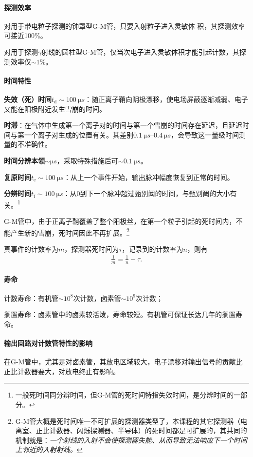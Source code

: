 \paragraph{探测效率}
对用于带电粒子探测的钟罩型G-M管，只要入射粒子进入灵敏体
积，其探测效率可接近100\%。

对用于探测$\gamma$射线的圆柱型G-M管，仅当次电子进入灵敏体积才能引起计数，其探测效率仅$\sim 1\%$。
\paragraph{时间特性}
\begin{compactitem}
	\item \textbf{失效（死）时间}$t_\mathrm d\sim\SI{100}{\micro s}$：随正离子鞘向阴极漂移，使电场屏蔽逐渐减弱、电子又能在阳极附近发生雪崩的时间。
	\item \textbf{时滞}：在气体中生成第一个离子对的时间与第一个雪崩的时间存在延迟，且延迟时间与第一个离子对生成的位置有关。其差别$\SIrange{0.1}{0.4}{\micro s}$，会导致这一量级时间测量的不准确性。
	\item \textbf{时间分辨本领}$\sim\si{\micro s}$，采取特殊措施后可$\sim\SI{0.1}{\micro s}$。
	\item \textbf{复原时间}$t_\mathrm e\sim\SI{100}{\micro s}$：从上一个事件开始，输出脉冲幅度恢复到正常的时间。
	\item \textbf{分辨时间}$t_\mathrm f\sim\SI{100}{\micro s}$：从0到下一个脉冲超过甄别阈的时间，与甄别阈的大小有关。\footnote{一般死时间同分辨时间，但G-M管的死时间特指失效时间，是分辨时间的一部分。}
\end{compactitem}
G-M管中，由于正离子鞘覆盖了整个阳极丝，在第一个粒子引起的死时间内，不能产生新的雪崩，死时间因此不再扩展。\footnote{G-M管大概是死时间唯一不可扩展的探测器类型了，本课程的其它探测器（电离室、正比计数器、闪烁探测器、半导体）的死时间都是可扩展的，其共同的机制就是：\textit{一个射线的入射不会使探测器失能、从而导致无法响应下一个时间上邻近的入射射线。}}

真事件的计数率为$m$，探测器死时间为$\tau$，记录到的计数率为$n$，则有
\begin{align}
	\frac1m=\frac1n-\tau.
\end{align}
\paragraph{寿命}计数寿命：有机管$\sim 10^8$次计数，卤素管$\sim 10^9$次计数；

搁置寿命：卤素管中的卤素较活泼，寿命较短。有机管可保证长达几年的搁置寿命。
\paragraph{输出回路对计数管特性的影响}
在G-M管中，尤其是对卤素管，其放电区域较大，电子漂移对输出信号的贡献比正比计数器要大，对放电终止有影响。

